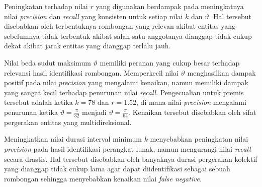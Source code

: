 Peningkatan terhadap nilai $r$ yang digunakan berdampak pada meningkatnya nilai \textit{precision} dan \textit{recall} yang konsisten untuk setiap nilai $k$ dan $\vartheta$. Hal tersebut disebabkan oleh terbentuknya rombongan yang relevan akibat entitas yang sebelumnya tidak terbentuk akibat salah satu anggotanya dianggap tidak cukup dekat akibat jarak entitas yang dianggap terlalu jauh.

Nilai beda sudut maksimum $\vartheta$ memiliki peranan yang cukup besar terhadap relevansi hasil identifikasi rombongan. Memperkecil nilai $\vartheta$ menghasilkan dampak positif pada nilai \textit{precision} yang mengalami kenaikan, namun memiliki dampak yang sangat kecil terhadap penurunan nilai \textit{recall}. Pengecualian untuk premis tersebut adalah ketika $k = 78$ dan $r = 1.52$, di mana nilai \textit{precision} mengalami penurunan ketika $\vartheta = \frac{\pi}{32}$ menjadi $\vartheta = \frac{\pi}{64}$. Kenaikan tersebut disebabkan oleh sifat pergerakan entitas yang multidireksional.

Meningkatkan nilai durasi interval minimum $k$ menyebabkan peningkatan nilai \textit{precision} pada hasil identifikasi perangkat lunak, namun mengurangi nilai \textit{recall} secara drastis. Hal tersebut disebabkan oleh banyaknya durasi pergerakan kolektif yang dianggap tidak cukup lama agar dapat diidentifikasi sebagai sebuah rombongan sehingga menyebabkan kenaikan nilai \textit{false negative}. 

